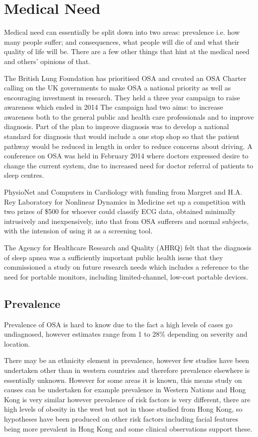 \section{Medical Need}

Medical need can essentially be split down into two areas: prevalence i.e. how many people suffer; and consequences, what people will die of and what their quality of life will be. There are a few other things that hint at the medical need and others’ opinions of that. 

The British Lung Foundation has prioritised OSA and created an OSA Charter calling on the UK governments to make OSA a national priority as well as encouraging investment in research. They held a three year campaign to raise awareness which ended in 2014 The campaign had two aims: to increase awareness both to the general public and health care professionals and to improve diagnosis. Part of the plan to improve diagnosis was to develop a national standard for diagnosis that would include a one stop shop so that the patient pathway would be reduced in length in order to reduce concerns about driving. A conference on OSA was held in February 2014 where doctors expressed desire to change the current system, due to increased need for doctor referral of patients to sleep centres. 

PhysioNet and Computers in Cardiology with funding from Margret and H.A. Rey Laboratory for Nonlinear Dynamics in Medicine set up a competition with two prizes of \$500 for whoever could classify ECG data, obtained minimally intrusively and inexpensively, into that from OSA sufferers and normal subjects, with the intension of using it as a screening tool. 

The Agency for Healthcare Research and Quality (AHRQ) felt that the diagnosis of sleep apnea was a sufficiently important public health issue that they commissioned a study on future research needs which includes a reference to the need for portable monitors, including limited-channel, low-cost portable devices.

\subsection{Prevalence}

Prevalence of OSA is hard to know due to the fact a high levels of cases go undiagnosed, however estimates range from 1 to 28\% depending on severity and location. 

There may be an ethnicity element in prevalence, however few studies have been undertaken other than in western countries and therefore prevalence elsewhere is essentially unknown. However for some areas it is known, this means study on causes can be undertaken for example prevalence in Western Nations and Hong Kong is very similar however prevalence of risk factors is very different, there are high levels of obesity in the west but not in those studied from Hong Kong, so hypotheses have been produced on other risk factors including facial features being more prevalent in Hong Kong and some clinical observations support these. 

